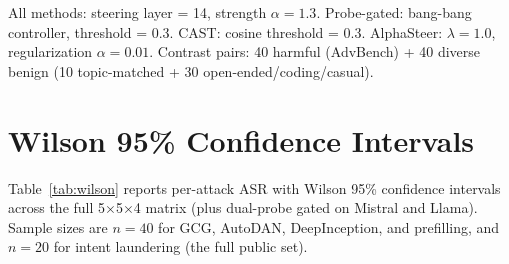 \documentclass{article}
\begin{document}
All methods: steering layer = 14, strength $\alpha = 1.3$. Probe-gated: bang-bang controller, threshold = 0.3. CAST: cosine threshold = 0.3. AlphaSteer: $\lambda = 1.0$, regularization $\alpha = 0.01$. Contrast pairs: 40 harmful (AdvBench) + 40 diverse benign (10 topic-matched + 30 open-ended/coding/casual).

\section{Wilson 95\% Confidence Intervals}
\label{app:wilson}

Table~\ref{tab:wilson} reports per-attack ASR with Wilson 95\% confidence intervals across the full 5$\times$5$\times$4 matrix (plus dual-probe gated on Mistral and Llama). Sample sizes are $n=40$ for GCG, AutoDAN, DeepInception, and prefilling, and $n=20$ for intent laundering (the full public set).
\end{document}
